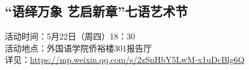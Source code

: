 \documentclass[letterpaper, 12pt]{article}
\begin{document}
\begin{multicols}{2}
\subsection{“语绎万象 艺启新章”七语艺术节} %
活动时间：5月22日（周四）18：30
\\活动地点：外国语学院侨裕楼301报告厅
\\详见：\url{https://mp.weixin.qq.com/s/2zSnHbY5LwM-x1uDcBlg6Q}
\end{multicols}
\end{document}
